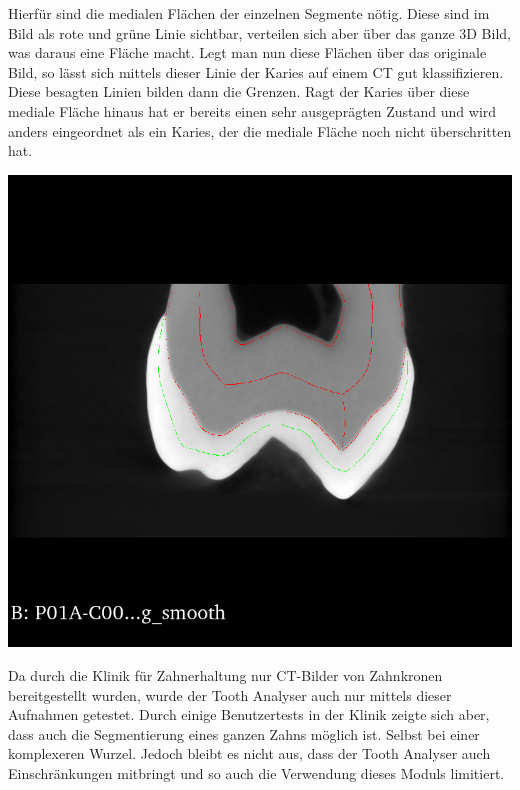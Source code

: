 \begin{minipage}{0.45\textwidth}
	Hierfür sind die medialen Flächen der einzelnen Segmente nötig. Diese sind im
	Bild als rote und grüne Linie sichtbar, verteilen sich aber über das ganze 3D Bild,
	was daraus eine Fläche macht. Legt man nun diese Flächen über das originale Bild,
	so lässt sich mittels dieser Linie der Karies auf einem CT gut klassifizieren.
	Diese besagten Linien bilden dann die Grenzen. Ragt der Karies über diese
	mediale Fläche hinaus hat er bereits einen sehr ausgeprägten Zustand und wird
	anders eingeordnet als ein Karies, der die mediale Fläche noch nicht überschritten
	hat.
\end{minipage}
\hfill
\begin{minipage}{0.45\textwidth}
	\centering
	\includegraphics[scale=0.2, width=\textwidth]{img/classification.png}
	 \label{fig:classification}
\end{minipage}

Da durch die Klinik für Zahnerhaltung nur CT-Bilder von Zahnkronen bereitgestellt
wurden, wurde der Tooth Analyser auch nur mittels dieser Aufnahmen getestet. Durch
einige Benutzertests in der Klinik zeigte sich aber, dass auch die Segmentierung
eines ganzen Zahns möglich ist. Selbst bei einer komplexeren Wurzel. Jedoch
bleibt es nicht aus, dass der Tooth Analyser auch Einschränkungen mitbringt und so
auch die Verwendung dieses Moduls limitiert.

